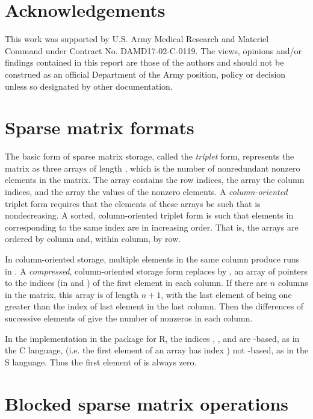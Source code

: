 \documentclass[12pt]{article}
\begin{document}
\section{Acknowledgements}
\label{sec:Ack}

This work was supported by U.S.{} Army Medical Research and Materiel
Command under Contract No.{} DAMD17-02-C-0119.  The views, opinions
and/or findings contained in this report are those of the authors and
should not be construed as an official Department of the Army
position, policy or decision unless so designated by other
documentation.

\appendix

\section{Sparse matrix formats}
\label{app:Sparse}

The basic form of sparse matrix storage, called the \emph{triplet}
form, represents the matrix as three arrays of length , which
is the number of nonredundant nonzero elements in the matrix.  The
 array contains the row indices, the  array the column
indices, and the  array the values of the nonzero elements.  A
\emph{column-oriented} triplet form requires that the elements of
these arrays be such that  is nondecreasing.  A sorted,
column-oriented triplet form is such that elements in 
corresponding to the same  index are in increasing order. That
is, the arrays are ordered by column and, within column, by row.

In column-oriented storage, multiple elements in the same column
produce runs in .  A \emph{compressed}, column-oriented
storage form replaces  by , an array of pointers to
the indices (in  and ) of the first element in each
column.  If there are $n$ columns in the matrix, this array is of
length $n+1$, with the last element of  being one greater than
the index of last element in the last column.  Then the differences of
successive elements of  give the number of nonzeros in each
column.

In the implementation in the  package for R, the indices
, , and  are -based, as in the C
language, (i.e.{} the first element of an array has index )
not -based, as in the S language.  Thus the first element of
 is always zero.  
  

\section{Blocked sparse matrix operations}
\label{app:blocked}
\end{document}
